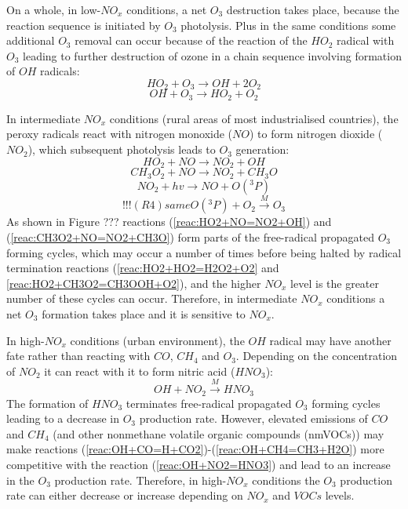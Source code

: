 \documentclass[11pt,a4paper]{article}
\begin{document}
On a whole, in low-$NO_x$ conditions, a net $O_3$ destruction takes place, because the reaction sequence is initiated by $O_3$ photolysis. Plus in the same conditions some additional $O_3$ removal can occur because of the reaction of the $HO_2$ radical with $O_3$ leading to further destruction of ozone in a chain sequence involving formation of $OH$ radicals:
\begin{equation}\label{reac:HO2+O3=OH+2O2}
HO_2 + O_3 \rightarrow OH + 2O_2
\end{equation}
\begin{equation}\label{reac:OH+O3=HO2+O2}
OH + O_3 \rightarrow HO_2 + O_2
\end{equation}

In intermediate $NO_x$ conditions (rural areas of most industrialised countries), the peroxy radicals react with nitrogen monoxide ($NO$) to form nitrogen dioxide ($NO_2$), which subsequent photolysis leads to $O_3$ generation:
\begin{equation}\label{reac:HO2+NO=NO2+OH}
HO_2 + NO \rightarrow NO_2 + OH
\end{equation}
\begin{equation}\label{reac:CH3O2+NO=NO2+CH3O}
CH_3O_2 + NO \rightarrow NO_2 + CH_3O
\end{equation}
\begin{equation}\label{reac:NO2+hv=NO+O3P}
NO_2 + hv \rightarrow NO + O(^3P)
\end{equation}
\begin{equation}\label{reac:O3P+O2=O3}
!!!(R4)sameO(^3P) + O_2 \xrightarrow{M} O_3
\end{equation}
As shown in Figure ??? reactions (\ref{reac:HO2+NO=NO2+OH}) and (\ref{reac:CH3O2+NO=NO2+CH3O}) form parts of the free-radical propagated $O_3$ forming cycles, which may occur a number of times before being halted by radical termination reactions (\ref{reac:HO2+HO2=H2O2+O2} and \ref{reac:HO2+CH3O2=CH3OOH+O2}), and the higher $NO_x$ level is the greater number of these cycles can occur. Therefore, in intermediate $NO_x$ conditions a net $O_3$ formation takes place and it is sensitive to $NO_x$.

In high-$NO_x$ conditions (urban environment), the $OH$ radical may have another fate rather than reacting with $CO$, $CH_4$ and $O_3$. Depending on the concentration of $NO_2$ it can react with it to form nitric acid ($HNO_3$):
\begin{equation}\label{reac:OH+NO2=HNO3}
OH + NO_2 \xrightarrow{M} HNO_3
\end{equation}
The formation of $HNO_3$ terminates free-radical propagated $O_3$ forming cycles leading to a decrease in $O_3$ production rate. However, elevated emissions of $CO$ and $CH_4$ (and other nonmethane volatile organic compounds (nmVOCs)) may make reactions (\ref{reac:OH+CO=H+CO2})-(\ref{reac:OH+CH4=CH3+H2O}) more competitive with the reaction (\ref{reac:OH+NO2=HNO3}) and lead to an increase in the $O_3$ production rate. Therefore, in high-$NO_x$ conditions the $O_3$ production rate can either decrease or increase depending on $NO_x$ and $VOCs$ levels. 
 
\end{document}
